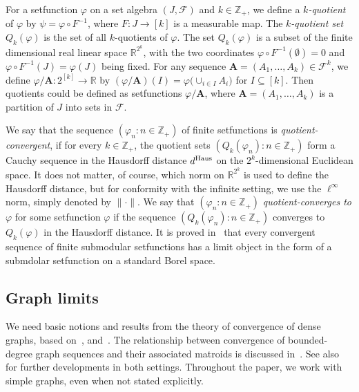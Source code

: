 \documentclass[10pt]{article}
\theoremstyle{plain}
\theoremstyle{definition}
\newcommand{\R}{\mathbb{R}}
\newcommand{\bA}{\mathbf{A}}
\newcommand{\bbZ}{\mathbb{Z}}
\newcommand{\cF}{\mathcal{F}}
\newcommand{\fg}{\varphi}
\newcommand{\Haus}{{\text{\rm Haus}}}
\begin{document}
For a setfunction $\fg$ on a set algebra $(J,\cF)$ and $k\in\bbZ_+$, we define a {\it $k$-quotient} of $\fg$ by $\psi=\fg\circ F^{-1}$, where $F\colon J\to[k]$ is a measurable map. The {\it $k$-quotient set} $Q_k(\fg)$ is the set of all $k$-quotients of $\fg$. The set $Q_k(\fg)$ is a subset of the finite dimensional real linear space $\R^{2^k}$, with the two coordinates $\fg\circ F^{-1}(\emptyset)=0$ and $\fg\circ F^{-1}(J)=\fg(J)$ being fixed. For any sequence $\bA=(A_1,\dots,A_k)\in\cF^k$, we define $\fg/\bA\colon 2^{[k]}\to\R$ by $(\fg/\bA)(I)=\fg\big(\cup_{i\in I} A_i\big)$ for $I\subseteq[k]$. Then quotients could be defined as setfunctions $\fg/\bA$,
where $\bA=(A_1,\dots,A_k)$ is a partition of $J$ into sets in $\cF$.

We say that the sequence $(\fg_n\colon n\in\bbZ_+)$ of finite setfunctions is {\it quotient-convergent}, if for every $k\in\bbZ_+$, the quotient sets $(Q_k(\fg_n)\colon n\in\bbZ_+)$ form a Cauchy sequence in the Hausdorff distance $d^\Haus$ on the $2^k$-dimensional Euclidean space. It does not matter, of course, which norm on $\R^{2^k}$ is used to define the Hausdorff distance, but for conformity with the infinite setting, we use the $\ell^\infty$ norm, simply denoted by $\|\cdot\|$. We say that $(\fg_n\colon  n\in\bbZ_+)$ {\it quotient-converges to} $\fg$ for some setfunction $\fg$ if the sequence $(Q_k(\fg_n)\colon n\in\bbZ_+)$ converges to $Q_k(\fg)$ in the Hausdorff distance. It is proved in~\cite{BBLTconv} that every convergent sequence of finite submodular setfunctions has a limit object in the form of a submdolar setfunction on a standard Borel space. 

\subsection{Graph limits}
\label{sec:graph}

We need basic notions and results from the theory of convergence of dense graphs, based on~\cite{BCLSV1},\cite{BCLSV2} and~\cite{LSzlimit}. The relationship between convergence of bounded-degree graph sequences and their associated matroids is discussed in~\cite{BBLTgraphing}. See also~\cite{lovasz2012large} for further developments in both settings. Throughout the paper, we work with simple graphs, even when not stated explicitly.
\end{document}
